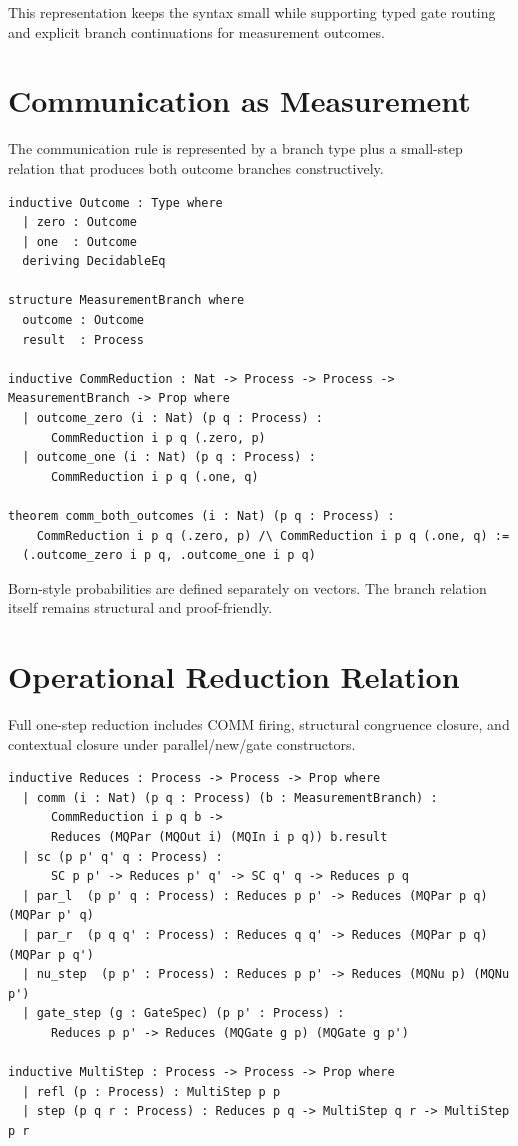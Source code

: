 \documentclass[11pt]{article}
\begin{document}
This representation keeps the syntax small while supporting typed gate routing and explicit branch continuations for measurement outcomes.

\section{Communication as Measurement}
The communication rule is represented by a branch type plus a small-step relation that produces both outcome branches constructively.

\begin{lstlisting}[caption={COMM branching object and witnesses (from \texttt{CommRule.lean})}]
inductive Outcome : Type where
  | zero : Outcome
  | one  : Outcome
  deriving DecidableEq

structure MeasurementBranch where
  outcome : Outcome
  result  : Process

inductive CommReduction : Nat -> Process -> Process -> MeasurementBranch -> Prop where
  | outcome_zero (i : Nat) (p q : Process) :
      CommReduction i p q (.zero, p)
  | outcome_one (i : Nat) (p q : Process) :
      CommReduction i p q (.one, q)

theorem comm_both_outcomes (i : Nat) (p q : Process) :
    CommReduction i p q (.zero, p) /\ CommReduction i p q (.one, q) :=
  (.outcome_zero i p q, .outcome_one i p q)
\end{lstlisting}

Born-style probabilities are defined separately on vectors. The branch relation itself remains structural and proof-friendly.

\section{Operational Reduction Relation}
Full one-step reduction includes COMM firing, structural congruence closure, and contextual closure under parallel/new/gate constructors.

\begin{lstlisting}[caption={One-step and multi-step reduction (from \texttt{Reduction.lean})}]
inductive Reduces : Process -> Process -> Prop where
  | comm (i : Nat) (p q : Process) (b : MeasurementBranch) :
      CommReduction i p q b ->
      Reduces (MQPar (MQOut i) (MQIn i p q)) b.result
  | sc (p p' q' q : Process) :
      SC p p' -> Reduces p' q' -> SC q' q -> Reduces p q
  | par_l  (p p' q : Process) : Reduces p p' -> Reduces (MQPar p q) (MQPar p' q)
  | par_r  (p q q' : Process) : Reduces q q' -> Reduces (MQPar p q) (MQPar p q')
  | nu_step  (p p' : Process) : Reduces p p' -> Reduces (MQNu p) (MQNu p')
  | gate_step (g : GateSpec) (p p' : Process) :
      Reduces p p' -> Reduces (MQGate g p) (MQGate g p')

inductive MultiStep : Process -> Process -> Prop where
  | refl (p : Process) : MultiStep p p
  | step (p q r : Process) : Reduces p q -> MultiStep q r -> MultiStep p r
\end{lstlisting}
\end{document}
